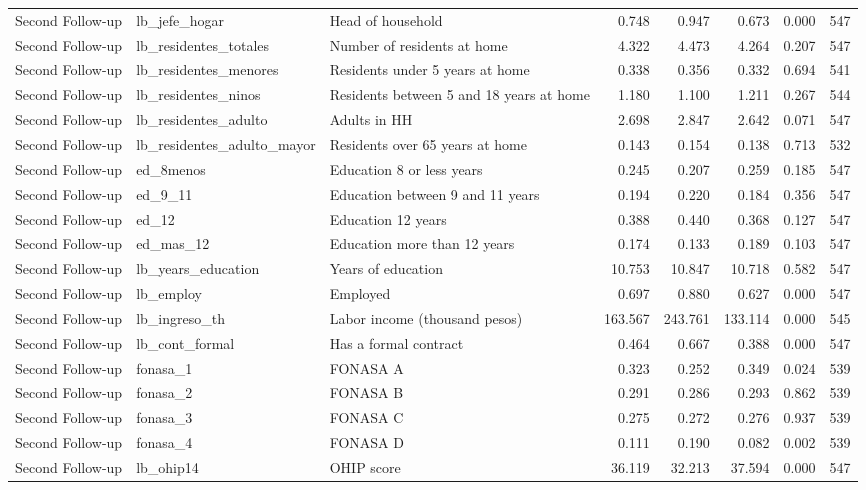 \begin{table}
\begin{tabular}[t]{lllrrrrr}
Second Follow-up & lb\_jefe\_hogar & Head of household & 0.748 & 0.947 & 0.673 & 0.000 & 547\\
Second Follow-up & lb\_residentes\_totales & Number of residents at home & 4.322 & 4.473 & 4.264 & 0.207 & 547\\
Second Follow-up & lb\_residentes\_menores & Residents under 5 years at home & 0.338 & 0.356 & 0.332 & 0.694 & 541\\
\addlinespace
Second Follow-up & lb\_residentes\_ninos & Residents between 5 and 18 years at home & 1.180 & 1.100 & 1.211 & 0.267 & 544\\
Second Follow-up & lb\_residentes\_adulto & Adults in HH & 2.698 & 2.847 & 2.642 & 0.071 & 547\\
Second Follow-up & lb\_residentes\_adulto\_mayor & Residents over 65 years at home & 0.143 & 0.154 & 0.138 & 0.713 & 532\\
Second Follow-up & ed\_8menos & Education 8 or less years & 0.245 & 0.207 & 0.259 & 0.185 & 547\\
Second Follow-up & ed\_9\_11 & Education between 9 and 11 years & 0.194 & 0.220 & 0.184 & 0.356 & 547\\
\addlinespace
Second Follow-up & ed\_12 & Education 12 years & 0.388 & 0.440 & 0.368 & 0.127 & 547\\
Second Follow-up & ed\_mas\_12 & Education more than 12 years & 0.174 & 0.133 & 0.189 & 0.103 & 547\\
Second Follow-up & lb\_years\_education & Years of education & 10.753 & 10.847 & 10.718 & 0.582 & 547\\
Second Follow-up & lb\_employ & Employed & 0.697 & 0.880 & 0.627 & 0.000 & 547\\
Second Follow-up & lb\_ingreso\_th & Labor income (thousand pesos) & 163.567 & 243.761 & 133.114 & 0.000 & 545\\
\addlinespace
Second Follow-up & lb\_cont\_formal & Has a formal contract & 0.464 & 0.667 & 0.388 & 0.000 & 547\\
Second Follow-up & fonasa\_1 & FONASA A & 0.323 & 0.252 & 0.349 & 0.024 & 539\\
Second Follow-up & fonasa\_2 & FONASA B & 0.291 & 0.286 & 0.293 & 0.862 & 539\\
Second Follow-up & fonasa\_3 & FONASA C & 0.275 & 0.272 & 0.276 & 0.937 & 539\\
Second Follow-up & fonasa\_4 & FONASA D & 0.111 & 0.190 & 0.082 & 0.002 & 539\\
\addlinespace
Second Follow-up & lb\_ohip14 & OHIP score & 36.119 & 32.213 & 37.594 & 0.000 & 547\\

\end{tabular}
\end{table}
